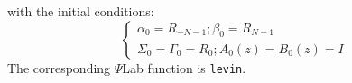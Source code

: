 with the initial conditions:
\begin{equation}
\left\{ 
\begin{array}{l}
\alpha_0=R_{-N-1};
\beta_0=R_{N+1}\\
\Sigma_0=\Gamma_0=R_0;
A_0(z)=B_0(z)=I
\end{array}
\right.
\label{e.lev.25}
\end{equation} 
The corresponding $\Psi$Lab function is {\tt levin}.

%
